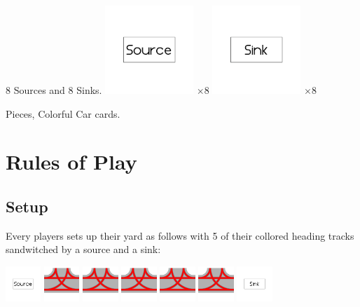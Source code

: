 \documentclass[12pt, letterpaper]{article}
\begin{document}
8 Sources and 8 Sinks.
\includegraphics[width=0.25\textwidth]{Source.png} $\times 8$
\includegraphics[width=0.25\textwidth]{Sink.png} $\times 8$

Pieces, Colorful Car cards.


\section{Rules of Play}

\subsection{Setup}

Every players sets up their yard as follows with 5 of their collored heading tracks sandwitched by a source and a sink:

\includegraphics[width=0.10\textwidth]{Source.png}
\includegraphics[width=0.10\textwidth]{RedHeading.png}
\includegraphics[width=0.10\textwidth]{RedHeading.png}
\includegraphics[width=0.10\textwidth]{RedHeading.png}
\includegraphics[width=0.10\textwidth]{RedHeading.png}
\includegraphics[width=0.10\textwidth]{RedHeading.png}
\includegraphics[width=0.10\textwidth]{Sink.png}
\end{document}
